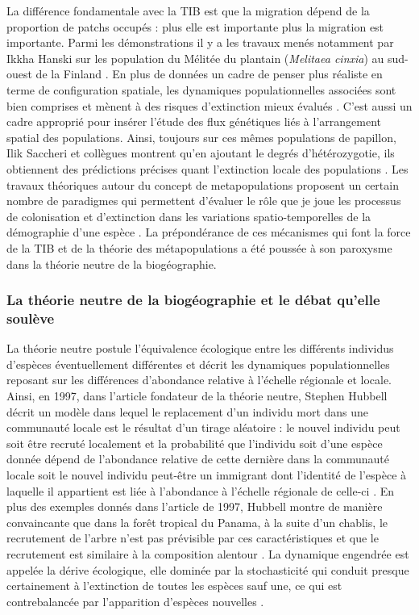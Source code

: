 La différence fondamentale avec la TIB est que la migration dépend de la
proportion de patchs occupés : plus elle est importante plus la
migration est importante. Parmi les démonstrations il y a les travaux
menés notamment par Ikkha Hanski sur les population du Mélitée du
plantain (\emph{Melitaea cinxia}) au sud-ouest de la Finland
\citep{Hanski1998}. En plus de données un cadre de penser plus réaliste
en terme de configuration spatiale, les dynamiques populationnelles
associées sont bien comprises et mènent à des risques d'extinction mieux
évalués \citep{Hanski1998}. C'est aussi un cadre approprié pour insérer
l'étude des flux génétiques liés à l'arrangement spatial des
populations. Ainsi, toujours sur ces mêmes populations de papillon, Ilik
Saccheri et collègues montrent qu'en ajoutant le degrés d'hétérozygotie,
ils obtiennent des prédictions précises quant l'extinction locale des
populations \citep{Saccheri1998}. Les travaux théoriques autour du
concept de metapopulations proposent un certain nombre de paradigmes qui
permettent d'évaluer le rôle que je joue les processus de colonisation
et d'extinction dans les variations spatio-temporelles de la démographie
d'une espèce \citep{Leibold2004}. La prépondérance de ces mécanismes qui
font la force de la TIB et de la théorie des métapopulations a été
poussée à son paroxysme dans la théorie neutre de la biogéographie.

\subsubsection*{La théorie neutre de la biogéographie et le débat
qu'elle
soulève}\label{la-thuxe9orie-neutre-de-la-bioguxe9ographie-et-le-duxe9bat-quelle-souluxe8ve}

La théorie neutre postule l'équivalence écologique entre les différents
individus d'espèces éventuellement différentes et décrit les dynamiques
populationnelles reposant sur les différences d'abondance relative à
l'échelle régionale et locale. Ainsi, en 1997, dans l'article fondateur
de la théorie neutre, Stephen Hubbell décrit un modèle dans lequel le
replacement d'un individu mort dans une communauté locale est le
résultat d'un tirage aléatoire : le nouvel individu peut soit être
recruté localement et la probabilité que l'individu soit d'une espèce
donnée dépend de l'abondance relative de cette dernière dans la
communauté locale soit le nouvel individu peut-être un immigrant dont
l'identité de l'espèce à laquelle il appartient est liée à l'abondance à
l'échelle régionale de celle-ci \citep{Hubbell1997}. En plus des
exemples donnés dans l'article de 1997, Hubbell montre de manière
convaincante que dans la forêt tropical du Panama, à la suite d'un
chablis, le recrutement de l'arbre n'est pas prévisible par ces
caractéristiques et que le recrutement est similaire à la composition
alentour \citep{Hubbell1999}. La dynamique engendrée est appelée la
dérive écologique, elle dominée par la stochasticité qui conduit presque
certainement à l'extinction de toutes les espèces sauf une, ce qui est
contrebalancée par l'apparition d'espèces nouvelles
\citep{Hubbell2010, Ricklefs2003}.

